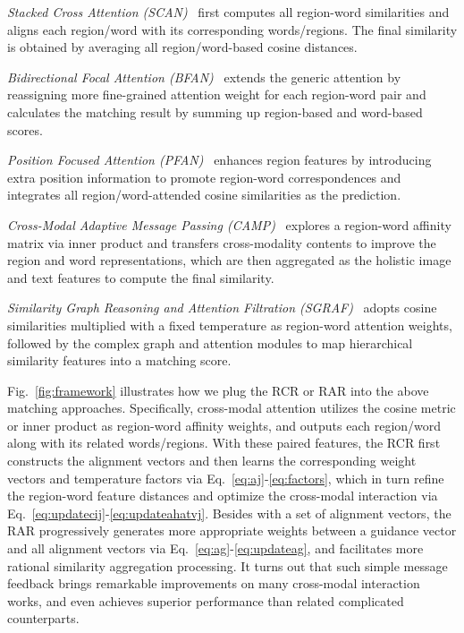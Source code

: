 \documentclass[journal]{IEEEtran}\newcommand{\ignore}[1]{}
\begin{document}
\textit{Stacked Cross Attention
(SCAN)}~\cite{SCAN} first computes all region-word similarities and aligns each region/word with its corresponding words/regions. The final similarity is obtained by averaging all region/word-based cosine distances.

\textit{Bidirectional Focal Attention (BFAN)}~\cite{BFAN} extends the generic attention by reassigning more fine-grained attention weight for each region-word pair and calculates the matching result by summing up region-based and word-based scores.

\textit{Position Focused Attention
(PFAN)}~\cite{PFAN} enhances region features by introducing extra position information to promote region-word correspondences and integrates all region/word-attended cosine similarities as the prediction.

\textit{Cross-Modal Adaptive Message Passing
(CAMP)}~\cite{CAMP} explores a region-word affinity matrix via inner product and transfers cross-modality contents to improve the region and word representations, which are then aggregated as the holistic image and text features to compute the final similarity.

\textit{Similarity Graph Reasoning and Attention Filtration (SGRAF)}~\cite{SGRAF} adopts cosine similarities multiplied with a fixed temperature as region-word attention weights, followed by the complex graph and attention modules to map hierarchical similarity features into a matching score.

Fig.~\ref{fig:framework} illustrates how we plug the RCR or RAR into the above matching approaches. Specifically, cross-modal attention utilizes the cosine metric or inner product as region-word affinity weights, and outputs each region/word along with its related words/regions. With these paired features, the RCR first constructs the alignment vectors and then learns the corresponding weight vectors and temperature factors via Eq.~\eqref{eq:aj}-\eqref{eq:factors}, which in turn refine the region-word feature distances and optimize the cross-modal interaction via Eq.~\eqref{eq:updatecij}-\eqref{eq:updateahatvj}. Besides with a set of alignment vectors, the RAR progressively generates more appropriate weights between a guidance vector and all alignment vectors via Eq.~\eqref{eq:ag}-\eqref{eq:updateag}, and facilitates more rational similarity aggregation processing. It turns out that such simple message feedback brings remarkable improvements on many cross-modal interaction works, and even achieves superior performance than related complicated counterparts.
\end{document}
